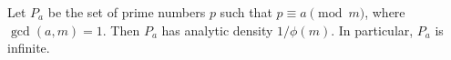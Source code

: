 Let $P_a$ be the set of prime numbers $p$ such that $p \equiv a \pmod{m}$, where $\gcd(a,m) = 1$. Then $P_a$ has analytic density $1/\phi(m)$. In particular, $P_a$ is infinite.
